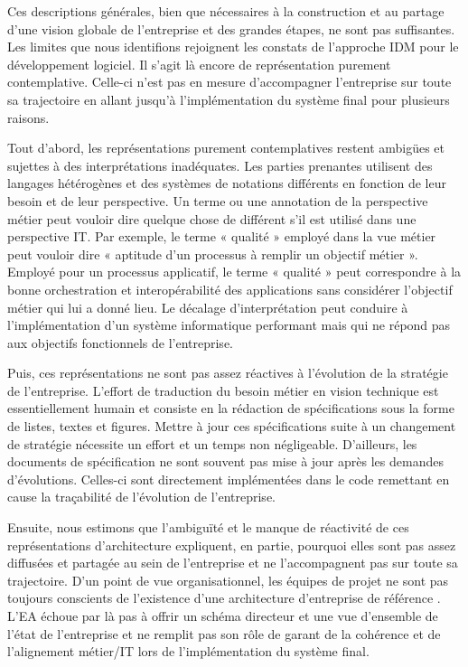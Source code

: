 	Ces descriptions générales, bien que nécessaires à la construction et au 
partage d'une vision globale de l'entreprise et des grandes étapes, ne sont pas 
suffisantes. Les limites que nous identifions rejoignent les constats de 
l'approche IDM pour le développement logiciel. Il s'agit là encore de 
représentation purement contemplative. Celle-ci n'est pas en mesure 
d'accompagner l'entreprise sur toute sa trajectoire en allant jusqu'à 
l'implémentation du système final pour plusieurs raisons.
	
	Tout d'abord, les représentations purement contemplatives restent ambigües et 
sujettes à des interprétations inadéquates. Les parties prenantes utilisent des 
langages hétérogènes et des systèmes de notations différents en fonction de leur 
besoin et de leur perspective. Un terme ou une annotation de la perspective 
métier peut vouloir dire quelque chose de différent s'il est utilisé dans une 
perspective IT. Par exemple, le terme « qualité » employé dans la vue métier 
peut vouloir dire « aptitude d'un processus à remplir un objectif métier ». 
Employé pour un processus applicatif, le terme « qualité » peut correspondre à 
la bonne orchestration et interopérabilité des applications sans considérer 
l'objectif métier qui lui a donné lieu. Le décalage d'interprétation peut 
conduire à l'implémentation d'un système informatique performant mais qui ne 
répond pas aux objectifs fonctionnels de l'entreprise. 
	
	Puis, ces représentations ne sont pas assez réactives à l'évolution de la 
stratégie de l'entreprise. L'effort de traduction du besoin métier en vision 
technique est essentiellement humain et consiste en la rédaction de 
spécifications sous la forme de listes, textes et figures. Mettre à jour ces 
spécifications suite à un changement de stratégie nécessite un effort et un 
temps non négligeable. D'ailleurs, les documents de spécification ne sont 
souvent pas mise à jour après les demandes d'évolutions. Celles-ci sont 
directement implémentées dans le code remettant en cause la traçabilité de 
l'évolution de l'entreprise.
	
	Ensuite, nous estimons que l'ambiguïté et le manque de réactivité de ces 
représentations d'architecture expliquent, en partie, pourquoi elles sont pas 
assez diffusées et partagée au sein de l'entreprise et ne l'accompagnent pas sur 
toute sa trajectoire. D'un point de vue organisationnel, les équipes de projet 
ne sont pas toujours conscients de l'existence d'une architecture d'entreprise 
de référence \cite{shah2007frameworks}. L'EA échoue par là pas à offrir un 
schéma directeur et une vue d'ensemble de l'état de l'entreprise et ne remplit 
pas son rôle de garant de la cohérence et de l'alignement métier/IT lors de 
l'implémentation du système final.
	
